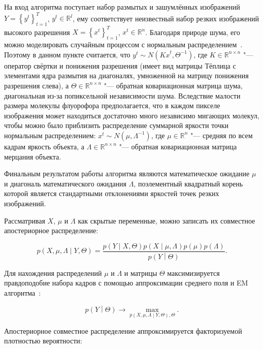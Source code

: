 На вход алгоритма поступает набор размытых и зашумлённых изображений $Y=\left\{y^t\right\}_{t=1}^T$, $y^t\in\mathbb{R}^l$, ему соответствует неизвестный набор резких изображений высокого разрешения $X=\left\{x^t\right\}_{t=1}^T$, $x^t\in\mathbb{R}^n$. Благодаря природе шума, его можно моделировать случайным процессом с нормальным распределением~\cite{gadsden1965some}. Поэтому в данном пункте считается, что $y^t \sim N({Kx}^t,\Theta^{-1})$, где $K\in\mathbb{R}^{n \times n}$ "--- оператор свёртки и понижения разрешения (имеет вид матрицы Тёплица с элементами ядра размытия на диагоналях, умноженной на матрицу понижения разрешения слева), а $\Theta\in\mathbb{R}^{n \times n}$ "--- обратная ковариационная матрица шума, диагональная из-за попиксельной независимости шума. Вследствие малости размера молекулы флуорофора предполагается, что в каждом пикселе изображения может находиться достаточно много независимо мигающих молекул, чтобы можно было приблизить распределение суммарной яркости точки нормальным распределением: $x^t \sim N(\mu,\Lambda^{-1})$, где $\mu\in\mathbb{R}^n$ "--- средняя по всем кадрам яркость объекта, а $\Lambda\in\mathbb{R}^{n \times n}$ "--- обратная ковариационная матрица мерцания объекта.

Финальным результатом работы алгоритма являются математическое ожидание $\mu$ и диагональ математического ожидания $\Lambda$, поэлементный квадратный корень которой является стандартными отклонениями яркостей точек резких изображений. 

Рассматривая $X$, $\mu$ и $\Lambda$ как скрытые переменные, можно записать их совместное апостериорное распределение:

\begin{equation*}
	p\left(X,\mu,\Lambda\middle|Y,\Theta\right)=\frac{p\left(Y\middle|X,\Theta\right)p\left(X\middle|\mu,\Lambda\right)p\left(\mu\right)p\left(\Lambda\right)}{p\left(Y\middle|\Theta\right)}.
\end{equation*}

Для нахождения распределений $\mu$ и $\Lambda$ и матрицы $\Theta$ максимизируется правдоподобие набора кадров с помощью аппроксимации среднего поля и EM алгоритма~\cite{bishop2006pattern}:

\begin{equation*}
	p\left(Y\middle|\Theta\right) \rightarrow \max_{p \left( X, \mu, \Lambda \middle| Y,\Theta \right),\Theta}.
\end{equation*}

Апостериорное совместное распределение аппроксимируется факторизуемой плотностью вероятности:

